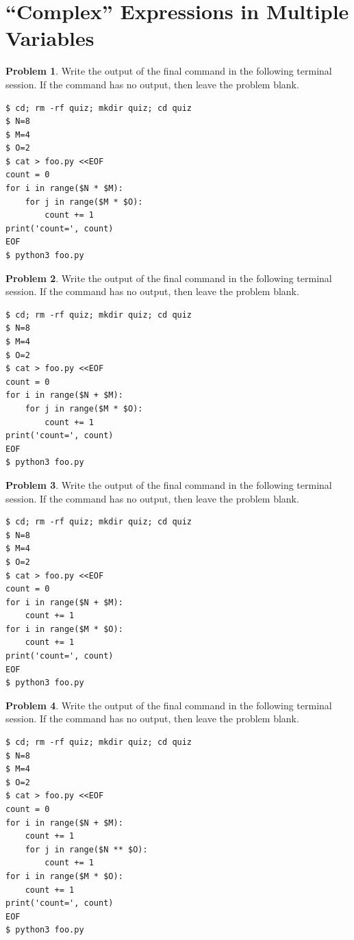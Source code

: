 \documentclass[10pt]{article}
\theoremstyle{definition}
\newtheorem{problem}{Problem}
\begin{document}
\filbreak
\section{``Complex'' Expressions in Multiple Variables}

\begin{problem}
    Write the output of the final command in the following terminal session.
    If the command has no output, then leave the problem blank.
\end{problem}
\begin{lstlisting}
$ cd; rm -rf quiz; mkdir quiz; cd quiz
$ N=8
$ M=4
$ O=2
$ cat > foo.py <<EOF
count = 0
for i in range($N * $M):
    for j in range($M * $O):
        count += 1
print('count=', count)
EOF
$ python3 foo.py
\end{lstlisting}
\vspace{0.4in}

\filbreak
\begin{problem}
    Write the output of the final command in the following terminal session.
    If the command has no output, then leave the problem blank.
\end{problem}
\begin{lstlisting}
$ cd; rm -rf quiz; mkdir quiz; cd quiz
$ N=8
$ M=4
$ O=2
$ cat > foo.py <<EOF
count = 0
for i in range($N + $M):
    for j in range($M * $O):
        count += 1
print('count=', count)
EOF
$ python3 foo.py
\end{lstlisting}
\vspace{0.4in}

\filbreak
\begin{problem}
    Write the output of the final command in the following terminal session.
    If the command has no output, then leave the problem blank.
\end{problem}
\begin{lstlisting}
$ cd; rm -rf quiz; mkdir quiz; cd quiz
$ N=8
$ M=4
$ O=2
$ cat > foo.py <<EOF
count = 0
for i in range($N + $M):
    count += 1
for i in range($M * $O):
    count += 1
print('count=', count)
EOF
$ python3 foo.py
\end{lstlisting}
\vspace{0.4in}

\filbreak
\begin{problem}
    Write the output of the final command in the following terminal session.
    If the command has no output, then leave the problem blank.
\end{problem}
\begin{lstlisting}
$ cd; rm -rf quiz; mkdir quiz; cd quiz
$ N=8
$ M=4
$ O=2
$ cat > foo.py <<EOF
count = 0
for i in range($N + $M):
    count += 1
    for j in range($N ** $O):
        count += 1
for i in range($M * $O):
    count += 1
print('count=', count)
EOF
$ python3 foo.py
\end{lstlisting}
\vspace{0.4in}
\end{document}
